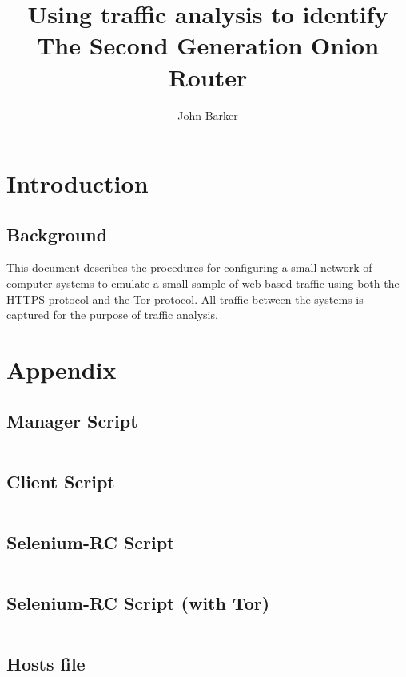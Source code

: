 \documentclass{ecuthesis}
\title{Using traffic analysis to identify The Second Generation Onion Router}
\author{John Barker}
\begin{document}
\maketitle

\chapter{Introduction}

\section{Background}

This document describes the procedures for configuring a small network of
computer systems to emulate a small sample of web based traffic using both the
HTTPS protocol and the Tor protocol. All traffic between the systems is captured
for the purpose of traffic analysis.



\chapter{Appendix}

\section{Manager Script}
\inputminted{ruby}{../experiment/simulation/manager/run_simulation.rb}

\section{Client Script}
\inputminted{ruby}{../experiment/simulation/client/client.rb}

\section{Selenium-RC Script}
\inputminted{bash}{../experiment/simulation/client/selenium-rc-with_tor.sh}

\section{Selenium-RC Script (with Tor)}
\inputminted{bash}{../experiment/simulation/client/selenium-rc.sh}

\section{Hosts file}
\inputminted{bash}{../experiment/hosts}
\end{document}
